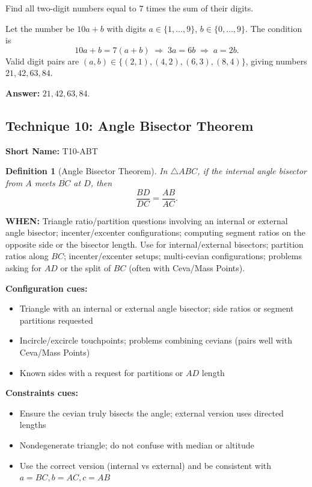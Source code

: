 \documentclass[12pt]{article}
\newtheorem{definition}{Definition}[section]
\newenvironment{problem}[1]
{\begin{tcolorbox}[colback=blue!5!white,colframe=blue!75!black,title={#1}]}{\end{tcolorbox}}
\newenvironment{solution}
{\begin{tcolorbox}[colback=green!5!white,colframe=green!75!black,title={Solution}]}{\end{tcolorbox}}
\begin{document}
\begin{problem}{Example: Two-Digit Number and Digit Sum}
Find all two-digit numbers equal to $7$ times the sum of their digits.
\end{problem}

\begin{solution}
Let the number be $10a + b$ with digits $a \in \{1,\dots,9\}$, $b \in \{0,\dots,9\}$. The condition is
\[
10a + b = 7(a + b) \;\Longrightarrow\; 3a = 6b \;\Longrightarrow\; a = 2b.
\]
Valid digit pairs are $(a,b) \in \{(2,1),(4,2),(6,3),(8,4)\}$, giving numbers $21,42,63,84$.

\textbf{Answer:} $21, 42, 63, 84$.
\end{solution}

\subsection{Technique 10: Angle Bisector Theorem}
\textbf{Short Name:} T10-ABT

\begin{definition}[Angle Bisector Theorem]
In $\triangle ABC$, if the internal angle bisector from $A$ meets $\overline{BC}$ at $D$, then
\[
\frac{BD}{DC} = \frac{AB}{AC}.
\]
\end{definition}

\textbf{WHEN:} Triangle ratio/partition questions involving an internal or external angle bisector; incenter/excenter configurations; computing segment ratios on the opposite side or the bisector length. Use for internal/external bisectors; partition ratios along $BC$; incenter/excenter setups; multi-cevian configurations; problems asking for $AD$ or the split of $BC$ (often with Ceva/Mass Points).

\textbf{Configuration cues:}
\begin{itemize}
    \item Triangle with an internal or external angle bisector; side ratios or segment partitions requested
    \item Incircle/excircle touchpoints; problems combining cevians (pairs well with Ceva/Mass Points)
    \item Known sides with a request for partitions or $AD$ length
\end{itemize}

\textbf{Constraints cues:}
\begin{itemize}
    \item Ensure the cevian truly bisects the angle; external version uses directed lengths
    \item Nondegenerate triangle; do not confuse with median or altitude
    \item Use the correct version (internal vs external) and be consistent with $a=BC, b=AC, c=AB$
\end{itemize}
\end{document}
